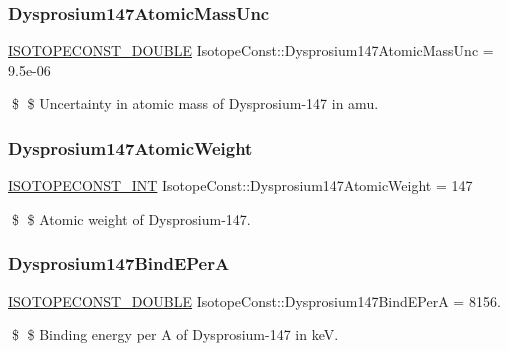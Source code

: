 \subsubsection{\texorpdfstring{Dysprosium147\+Atomic\+Mass\+Unc}{Dysprosium147AtomicMassUnc}}
{\footnotesize\ttfamily \mbox{\hyperlink{group___isotope_const-_macros_ga8f45a7272ce02c0b4c65c44636ed719a}{I\+S\+O\+T\+O\+P\+E\+C\+O\+N\+S\+T\+\_\+\+D\+O\+U\+B\+LE}} Isotope\+Const\+::\+Dysprosium147\+Atomic\+Mass\+Unc = 9.\+5e-\/06}

\$ \$ Uncertainty in atomic mass of Dysprosium-\/147 in amu. \mbox{\label{group___isotope_const-_dysprosium-_dy147_gab959df1140c5aeaeea4bc21f35ad348f}} 
\subsubsection{\texorpdfstring{Dysprosium147\+Atomic\+Weight}{Dysprosium147AtomicWeight}}
{\footnotesize\ttfamily \mbox{\hyperlink{group___isotope_const-_macros_ga5f18360b3e99483a35c32d789e62621c}{I\+S\+O\+T\+O\+P\+E\+C\+O\+N\+S\+T\+\_\+\+I\+NT}} Isotope\+Const\+::\+Dysprosium147\+Atomic\+Weight = 147}

\$ \$ Atomic weight of Dysprosium-\/147. \mbox{\label{group___isotope_const-_dysprosium-_dy147_ga20fd40a256f2264aa9f2061c67cf9fbc}} 
\subsubsection{\texorpdfstring{Dysprosium147\+Bind\+E\+PerA}{Dysprosium147BindEPerA}}
{\footnotesize\ttfamily \mbox{\hyperlink{group___isotope_const-_macros_ga8f45a7272ce02c0b4c65c44636ed719a}{I\+S\+O\+T\+O\+P\+E\+C\+O\+N\+S\+T\+\_\+\+D\+O\+U\+B\+LE}} Isotope\+Const\+::\+Dysprosium147\+Bind\+E\+PerA = 8156.}

\$ \$ Binding energy per A of Dysprosium-\/147 in keV. \mbox{\label{group___isotope_const-_dysprosium-_dy147_ga3e46b55a649a66e95b4bb43ccb8bf5fb}} 
